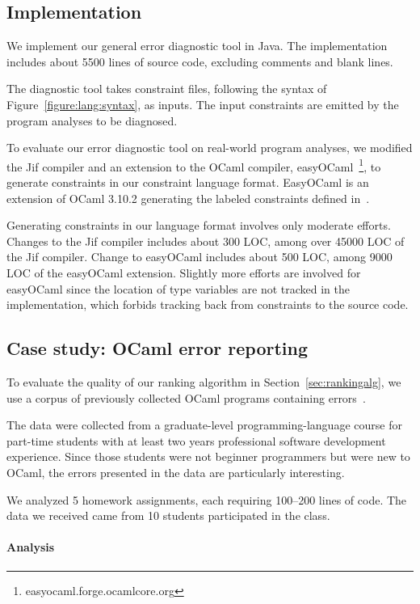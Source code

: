 \subsection{Implementation}

We implement our general error diagnostic tool in Java. The
implementation includes about 5500 lines of source code, excluding
comments and blank lines.

The diagnostic tool takes constraint files, following the syntax of
Figure~\ref{figure:lang:syntax}, as inputs. The input constraints are
emitted by the program analyses to be diagnosed.

To evaluate our error diagnostic tool on real-world program analyses,
we modified the Jif compiler and an extension to the OCaml compiler,
easyOCaml~\footnote{easyocaml.forge.ocamlcore.org}, to generate
constraints in our constraint language format. EasyOCaml is an
extension of OCaml 3.10.2 generating the labeled constraints defined
in~\cite{haack:slicing}.

Generating constraints in our language format involves only moderate
efforts. Changes to the Jif compiler includes about 300 LOC, among
over 45000 LOC of the Jif compiler. Change to easyOCaml includes about
500 LOC, among 9000 LOC of the easyOCaml extension.  Slightly more
efforts are involved for easyOCaml since the location of type
variables are not tracked in the implementation, which forbids
tracking back from constraints to the source code.

\subsection{Case study: OCaml error reporting}

To evaluate the quality of our ranking algorithm in
Section~\ref{sec:rankingalg}, we use a corpus of previously collected
OCaml programs containing errors~\cite{lerner:pldi07}.

The data were collected from a graduate-level programming-language
course for part-time students with at least two years professional
software development experience. Since those students were not
beginner programmers but were new to OCaml, the errors presented in
the data are particularly interesting.

We analyzed 5 homework assignments, each requiring 100--200 lines of
code. The data we received came from 10 students participated in the
class.

\paragraph{Analysis}

